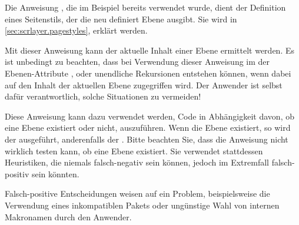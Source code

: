 Die Anweisung
, die
im Beispiel bereits verwendet wurde, dient der Definition eines Seitenstils,
der die neu definiert Ebene ausgibt. Sie wird in
\autoref{sec:scrlayer.pagestyles},
 erklärt werden.%
\EndIndexGroup


\begin{Declaration}
\end{Declaration}
Mit dieser Anweisung kann der aktuelle
Inhalt einer Ebene ermittelt werden. Es ist unbedingt zu
beachten, dass bei Verwendung dieser Anweisung im  der
Ebenen-Attribute ,  oder
 unendliche Rekursionen entstehen können, wenn dabei auf
den Inhalt der aktuellen Ebene zugegriffen wird. Der Anwender ist selbst dafür
verantwortlich, solche Situationen zu vermeiden!%
\EndIndexGroup


\begin{Declaration}
\end{Declaration}
Diese Anweisung kann dazu verwendet werden, Code in Abhängigkeit davon, ob
eine Ebene existiert oder nicht, auszuführen. Wenn die Ebene  existiert, so wird der  ausgeführt, anderenfalls der
. Bitte beachten Sie, dass die Anweisung nicht wirklich
testen kann, ob eine Ebene existiert. Sie verwendet stattdessen Heuristiken,
die niemals falsch-negativ sein können, jedoch im Extremfall falsch-positiv
sein könnten. %
\iffalse%
Nichtsdestotrotz: Falls der Test falsch-positiv ist, läuft etwas
schief. Beispielsweise könnte dies ein Indikator für die Verwendung eines
inkompatiblen Pakets oder dafür sein, dass der Anwender etwas tut, was er
besser nicht tun sollte.%
\else
Falsch-positive Entscheidungen weisen auf ein Problem, beispielsweise die
Verwendung eines inkompatiblen Pakets oder ungünstige Wahl von internen
Makronamen durch den Anwender.%
\fi
\EndIndexGroup


